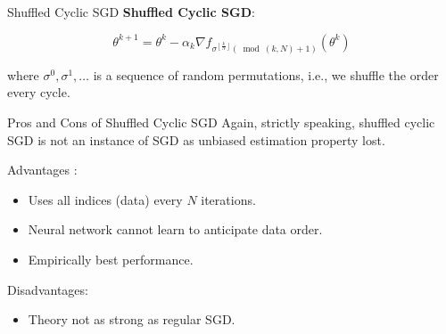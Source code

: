 \begin{frame}[allowframebreaks]

\begin{mydefinitionblock}{2.19}{Shuffled Cyclic SGD}
    \textbf{Shuffled Cyclic SGD}:

    $$
    \theta^{k+1}=\theta^{k}-\alpha_{k} \nabla f_{\sigma^{\left \lfloor \frac{k}{N} \right \rfloor} (\bmod (k, N)+1)}\left(\theta^{k}\right)
    $$

    where $\sigma^{0}, \sigma^{1}, \ldots$ is a sequence of random permutations, i.e., we shuffle the order every cycle.
\end{mydefinitionblock}

\end{frame}

\begin{frame}[allowframebreaks]

\begin{myconceptblock}{2.19}{Pros and Cons of Shuffled Cyclic SGD}
    Again, strictly speaking, shuffled cyclic SGD is not an instance of SGD as unbiased estimation property lost.

    Advantages :

    \begin{itemize}
        \item Uses all indices (data) every $N$ iterations.
        \item Neural network cannot learn to anticipate data order.
        \item Empirically best performance.
    \end{itemize}

    Disadvantages:

    \begin{itemize}
        \item Theory not as strong as regular SGD.
    \end{itemize}
\end{myconceptblock}

\end{frame}

